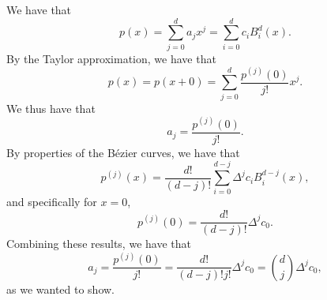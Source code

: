 \begin{solution}
    We have that
    \begin{equation*}
        p(x) = \sum_{j=0}^d a_j x^j = \sum_{i=0}^d c_i B_i^d(x).
    \end{equation*}
    By the Taylor approximation, we have that
    \begin{equation*}
        p(x) = p(x + 0) = \sum_{j=0}^d \frac{p^{(j)}(0)}{j!} x^j.
    \end{equation*}
    We thus have that
    \begin{equation*}
        a_j = \frac{p^{(j)}(0)}{j!}.
    \end{equation*}
    By properties of the Bézier curves, we have that
    \begin{equation*}
        p^{(j)}(x) = \frac{d!}{(d-j)!} \sum_{i = 0}^{d - j} \Delta^j c_i B_i^{d-j}(x),
    \end{equation*}
    and specifically for $x = 0$,
    \begin{equation*}
        p^{(j)}(0) = \frac{d!}{(d-j)!} \Delta^j c_0.
    \end{equation*}
    Combining these results, we have that
    \begin{equation*}
        a_j = \frac{p^{(j)}(0)}{j!} = \frac{d!}{(d-j)! j!} \Delta^j c_0 = \binom{d}{j} \Delta^j c_0,
    \end{equation*}
    as we wanted to show.
\end{solution}
